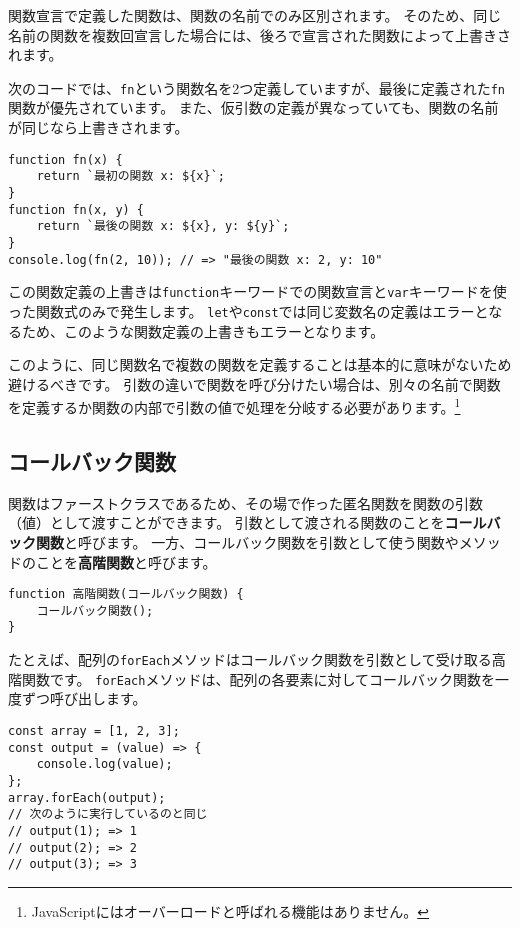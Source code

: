 \begin{tcolorbox}[title=同じ名前の関数宣言は上書きされる]\label{function-overwrite}

関数宣言で定義した関数は、関数の名前でのみ区別されます。
そのため、同じ名前の関数を複数回宣言した場合には、後ろで宣言された関数によって上書きされます。

次のコードでは、\texttt{fn}という関数名を2つ定義していますが、最後に定義された\texttt{fn}関数が優先されています。
また、仮引数の定義が異なっていても、関数の名前が同じなら上書きされます。

\begin{lstlisting}
function fn(x) {
    return `最初の関数 x: ${x}`;
}
function fn(x, y) {
    return `最後の関数 x: ${x}, y: ${y}`;
}
console.log(fn(2, 10)); // => "最後の関数 x: 2, y: 10"
\end{lstlisting}

この関数定義の上書きは\texttt{function}キーワードでの関数宣言と\texttt{var}キーワードを使った関数式のみで発生します。
\texttt{let}や\texttt{const}では同じ変数名の定義はエラーとなるため、このような関数定義の上書きもエラーとなります。

このように、同じ関数名で複数の関数を定義することは基本的に意味がないため避けるべきです。
引数の違いで関数を呼び分けたい場合は、別々の名前で関数を定義するか関数の内部で引数の値で処理を分岐する必要があります。\footnote{JavaScriptにはオーバーロードと呼ばれる機能はありません。}
\end{tcolorbox}

\hypertarget{callback}{%
\subsection{コールバック関数}\label{callback}}

関数はファーストクラスであるため、その場で作った匿名関数を関数の引数（値）として渡すことができます。
引数として渡される関数のことを\textbf{コールバック関数}と呼びます。
一方、コールバック関数を引数として使う関数やメソッドのことを\textbf{高階関数}と呼びます。

\begin{lstlisting}
function 高階関数(コールバック関数) {
    コールバック関数();
}
\end{lstlisting}

たとえば、配列の\texttt{forEach}メソッドはコールバック関数を引数として受け取る高階関数です。
\texttt{forEach}メソッドは、配列の各要素に対してコールバック関数を一度ずつ呼び出します。

\begin{lstlisting}
const array = [1, 2, 3];
const output = (value) => {
    console.log(value);
};
array.forEach(output);
// 次のように実行しているのと同じ
// output(1); => 1
// output(2); => 2
// output(3); => 3
\end{lstlisting}

